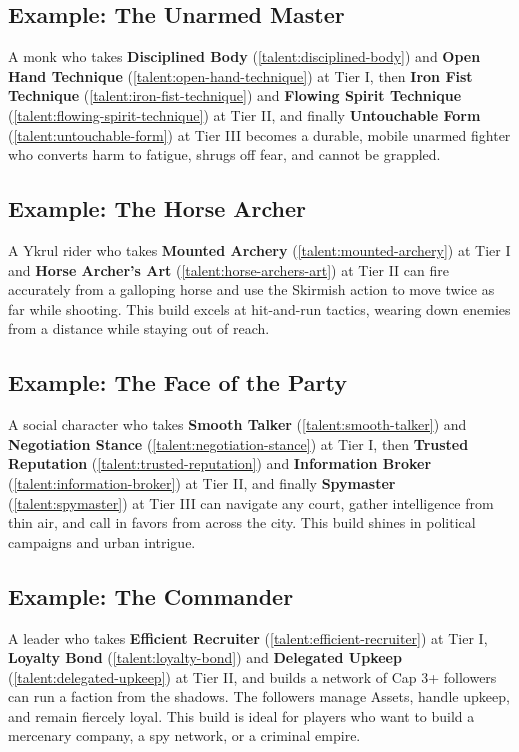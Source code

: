 \subsection*{Example: The Unarmed Master}
\label{sec:unarmed-master-example}
A monk who takes \textbf{Disciplined Body} (\ref{talent:disciplined-body}) and \textbf{Open Hand Technique} (\ref{talent:open-hand-technique}) at Tier I, then \textbf{Iron Fist Technique} (\ref{talent:iron-fist-technique}) and \textbf{Flowing Spirit Technique} (\ref{talent:flowing-spirit-technique}) at Tier II, and finally \textbf{Untouchable Form} (\ref{talent:untouchable-form}) at Tier III becomes a durable, mobile unarmed fighter who converts harm to fatigue, shrugs off fear, and cannot be grappled.

\subsection*{Example: The Horse Archer}
\label{sec:horse-archer-example}
A Ykrul rider who takes \textbf{Mounted Archery} (\ref{talent:mounted-archery}) at Tier I and \textbf{Horse Archer's Art} (\ref{talent:horse-archers-art}) at Tier II can fire accurately from a galloping horse and use the Skirmish action to move twice as far while shooting. This build excels at hit-and-run tactics, wearing down enemies from a distance while staying out of reach.

\subsection*{Example: The Face of the Party}
\label{sec:face-example}
A social character who takes \textbf{Smooth Talker} (\ref{talent:smooth-talker}) and \textbf{Negotiation Stance} (\ref{talent:negotiation-stance}) at Tier I, then \textbf{Trusted Reputation} (\ref{talent:trusted-reputation}) and \textbf{Information Broker} (\ref{talent:information-broker}) at Tier II, and finally \textbf{Spymaster} (\ref{talent:spymaster}) at Tier III can navigate any court, gather intelligence from thin air, and call in favors from across the city. This build shines in political campaigns and urban intrigue.

\subsection*{Example: The Commander}
\label{sec:commander-example}
A leader who takes \textbf{Efficient Recruiter} (\ref{talent:efficient-recruiter}) at Tier I, \textbf{Loyalty Bond} (\ref{talent:loyalty-bond}) and \textbf{Delegated Upkeep} (\ref{talent:delegated-upkeep}) at Tier II, and builds a network of Cap 3+ followers can run a faction from the shadows. The followers manage Assets, handle upkeep, and remain fiercely loyal. This build is ideal for players who want to build a mercenary company, a spy network, or a criminal empire.

